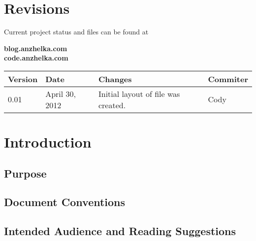\documentclass[english]{article}
\numberwithin{equation}{section} %
\begin{document}

\renewcommand{\contentsname}{Table of Contents}
\tableofcontents


\section*{Revisions}
Current project status and files can be found at
\begin{center}
 \textbf{blog.anzhelka.com} \\
 \textbf{code.anzhelka.com} \\
\end{center}

\begin{longtable}{l | l | p{5cm} | l}
\hline
\textbf{Version} & \textbf{Date} & \textbf{Changes} & \textbf{Commiter}\\
\hline
0.01	& April 30, 2012 & Initial layout of file was created. 	& Cody \\
\hline
\end{longtable}



\newpage
{}




\section{Introduction}
\subsection{Purpose}
\subsection{Document Conventions}
\subsection{Intended Audience and Reading Suggestions}
\end{document}
